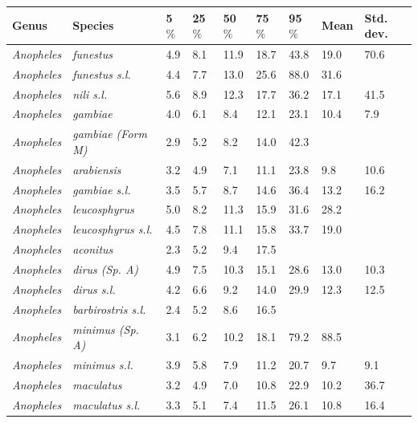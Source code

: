 \documentclass[12pt]{article}
\begin{document}
\begin{table}[htbp!]
\begin{tabular}{l|l|l|l|l|l|l|l|l}
	\textbf{Genus} & \textbf{Species} & \textbf{5$\%$} & \textbf{25$\%$} & \textbf{50$\%$} &
	\textbf{75$\%$} & \textbf{95$\%$} & \textbf{Mean} & \textbf{Std. dev.} \\
	\hline
	\textit{Anopheles} & \textit{funestus} & 4.9 & 8.1 & 11.9 & 18.7 & 43.8 & 19.0 & 70.6 \\
	\textit{Anopheles} & \textit{funestus s.l.} & 4.4 & 7.7 & 13.0 & 25.6 & 88.0 & 31.6 &
	\text{$>$100} \\
	\textit{Anopheles} & \textit{nili s.l.} & 5.6 & 8.9 & 12.3 & 17.7 & 36.2 & 17.1 & 41.5 \\
	\textit{Anopheles} & \textit{gambiae} & 4.0 & 6.1 & 8.4 & 12.1 & 23.1 & 10.4 & 7.9 \\
	\textit{Anopheles} & \textit{gambiae (Form M)} & 2.9 & 5.2 & 8.2 & 14.0 & 42.3 &
	\text{$>$100} & \text{$>$100} \\
	\textit{Anopheles} & \textit{arabiensis} & 3.2 & 4.9 & 7.1 & 11.1 & 23.8 & 9.8 & 10.6 \\
	\textit{Anopheles} & \textit{gambiae s.l.} & 3.5 & 5.7 & 8.7 & 14.6 & 36.4 & 13.2 & 16.2 \\
	\textit{Anopheles} & \textit{leucosphyrus} & 5.0 & 8.2 & 11.3 & 15.9 & 31.6 & 28.2 &
	\text{$>$100} \\
	\textit{Anopheles} & \textit{leucosphyrus s.l.} & 4.5 & 7.8 & 11.1 & 15.8 & 33.7 & 19.0 &
	\text{$>$100} \\
	\textit{Anopheles} & \textit{aconitus} & 2.3 & 5.2 & 9.4 & 17.5 & \text{$>$100} &
	\text{$>$100} & \text{$>$100} \\
	\textit{Anopheles} & \textit{dirus (Sp. A)} & 4.9 & 7.5 & 10.3 & 15.1 & 28.6 & 13.0
	& 10.3 \\
	\textit{Anopheles} & \textit{dirus s.l.} & 4.2 & 6.6 & 9.2 & 14.0 & 29.9 & 12.3 & 12.5 \\
	\textit{Anopheles} & \textit{barbirostris s.l.} & 2.4 & 5.2 & 8.6 & 16.5 & \text{$>$100} &
	\text{$>$100} & \text{$>$100} \\
	\textit{Anopheles} & \textit{minimus (Sp. A)} & 3.1 & 6.2 & 10.2 & 18.1 & 79.2 &
	88.5 & \text{$>$100} \\
	\textit{Anopheles} & \textit{minimus s.l.} & 3.9 & 5.8 & 7.9 & 11.2 & 20.7 & 9.7 & 9.1 \\
	\textit{Anopheles} & \textit{maculatus} & 3.2 & 4.9 & 7.0 & 10.8 & 22.9 & 10.2 & 36.7 \\
	\textit{Anopheles} & \textit{maculatus s.l.} & 3.3 & 5.1 & 7.4 & 11.5 & 26.1 & 10.8 & 16.4

\end{tabular}
\end{table}
\end{document}
